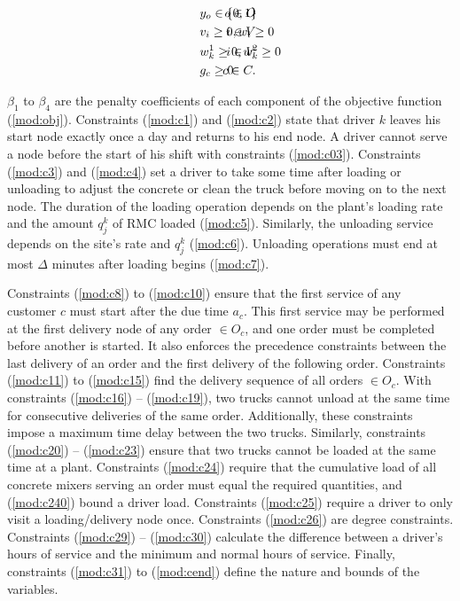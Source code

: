 \documentclass{article}
\begin{document}
\begin{alignat}{3}
    \label{mod:c36}        & y_o \in \{0,1\}     & \hspace{-20mm}  o \in O            \text{ }                     \\
    \label{mod:c37}        & v_i \geq 0,  w_i \geq 0     & \hspace{-20mm}  i \in V         \text{ }                \\
    \label{mod:c38}        & w^1_{k} \geq 0,  w^2_k \geq 0  & \hspace{-20mm}  i \in V         \text{ }        \\
    \label{mod:cend}       & g_c \geq 0    & \hspace{-20mm}  c \in C.  \text{ }
\end{alignat}

$\beta_1$ to $\beta_4$ are the penalty coefficients of each component of the objective function (\ref{mod:obj}). Constraints (\ref{mod:c1}) and (\ref{mod:c2}) state that driver $k$ leaves his start node exactly once a day and returns to his end node. A driver cannot serve a node before the start of his shift with constraints (\ref{mod:c03}). Constraints (\ref{mod:c3}) and (\ref{mod:c4}) set a driver to take some time after loading or unloading to adjust the concrete or clean the truck before moving on to the next node. The duration of the loading operation depends on the plant's loading rate and the amount $q^k_j$ of RMC loaded (\ref{mod:c5}). Similarly, the unloading service depends on the site's rate and $q^k_j$ (\ref{mod:c6}). Unloading operations must end at most $\Delta$ minutes after loading begins (\ref{mod:c7}).

Constraints (\ref{mod:c8}) to (\ref{mod:c10}) ensure that the first service of any customer $c$ must start after the due time $a_c$. This first service may be performed at the first delivery node of any order $\in O_c$, and one order must be completed before another is started. It also enforces the precedence constraints between the last delivery of an order and the first delivery of the following order.
Constraints (\ref{mod:c11}) to (\ref{mod:c15}) find the delivery sequence of all orders $\in O_c$. With constraints (\ref{mod:c16}) -- (\ref{mod:c19}), two trucks cannot unload at the same time for consecutive deliveries of the same order. Additionally, these constraints impose a maximum time delay between the two trucks. Similarly, constraints (\ref{mod:c20}) -- (\ref{mod:c23}) ensure that two trucks cannot be loaded at the same time at a plant. Constraints (\ref{mod:c24}) require that the cumulative load of all concrete mixers serving an order must equal the required quantities, and (\ref{mod:c240}) bound a driver load. Constraints (\ref{mod:c25}) require a driver to only visit a loading/delivery node once. Constraints (\ref{mod:c26}) are degree constraints. Constraints (\ref{mod:c29}) -- (\ref{mod:c30}) calculate the difference between a driver's hours of service and the minimum and normal hours of service. Finally, constraints (\ref{mod:c31}) to (\ref{mod:cend}) define the nature and bounds of the variables.
\end{document}
